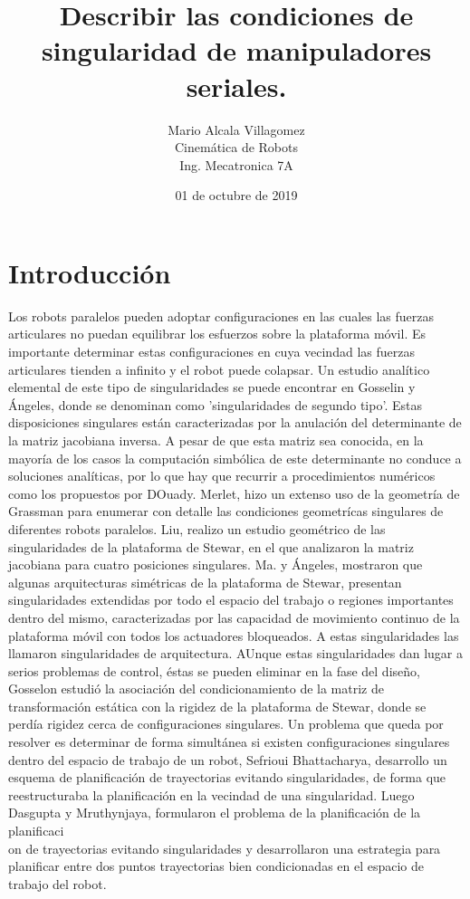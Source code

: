 \documentclass[letter,openright,12pt,spanish]{report}
\title{\textbf{Describir las condiciones de singularidad de manipuladores seriales.}}
\author{Mario Alcala Villagomez\\
		Cinem\'atica de Robots\\
		Ing. Mecatronica 7A}
\date{01 de octubre de 2019}
\begin{document}
\maketitle

\section{Introducci\'on}

Los robots paralelos pueden adoptar configuraciones en las cuales las fuerzas articulares no puedan equilibrar los esfuerzos sobre la plataforma m\'ovil. Es importante determinar estas configuraciones en cuya vecindad las fuerzas articulares tienden a infinito y el robot puede colapsar. Un estudio anal\'itico elemental de este tipo de singularidades se puede encontrar en Gosselin y \'Angeles, donde se denominan como 'singularidades de segundo tipo'. Estas disposiciones singulares est\'an caracterizadas por la anulaci\'on del determinante de la matriz jacobiana inversa. A pesar de que esta matriz sea conocida, en la mayor\'ia de los casos la computaci\'on simb\'olica de este determinante no conduce a soluciones anal\'iticas, por lo que hay que recurrir a procedimientos num\'ericos como los propuestos por DOuady. Merlet, hizo un extenso uso de la geometr\'ia de Grassman para enumerar con detalle las condiciones geometr\'icas singulares de diferentes robots paralelos. Liu, realizo un estudio geom\'etrico de las singularidades de la plataforma de Stewar, en el que analizaron la matriz jacobiana para cuatro posiciones singulares. Ma. y \'Angeles, mostraron que algunas arquitecturas sim\'etricas de la plataforma de Stewar, presentan singularidades extendidas por todo el espacio del trabajo o regiones importantes dentro del mismo, caracterizadas por las capacidad de movimiento continuo de la plataforma m\'ovil con todos los actuadores bloqueados. A estas singularidades las llamaron singularidades de arquitectura. AUnque estas singularidades dan lugar a serios problemas de control, \'estas se pueden eliminar en la fase del diseño, Gosselon estudi\'o la asociaci\'on del condicionamiento de la matriz de transformaci\'on est\'atica con la rigidez de la plataforma de Stewar, donde se perd\'ia rigidez cerca de configuraciones singulares. Un problema que queda por resolver es determinar de forma simult\'anea si existen configuraciones singulares  dentro del espacio de trabajo de un robot, Sefrioui Bhattacharya, desarrollo un esquema de planificaci\'on de trayectorias evitando singularidades, de forma que reestructuraba la planificaci\'on en la vecindad de una singularidad. Luego Dasgupta y Mruthynjaya, formularon el problema de la planificaci\'on de la planificaci\\on de trayectorias evitando singularidades y desarrollaron una estrategia para planificar entre dos puntos trayectorias bien condicionadas en el espacio de trabajo del robot.
\end{document}

